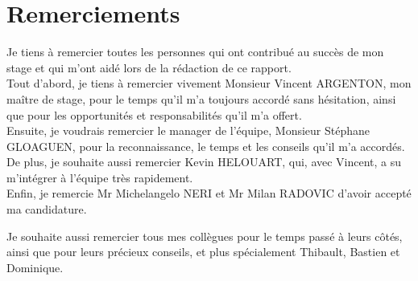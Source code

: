 \chapter*{Remerciements} %

Je tiens à remercier toutes les personnes qui ont contribué au succès de mon stage et qui m'ont aidé lors de la rédaction de ce rapport.  \\

Tout d'abord, je tiens à remercier vivement Monsieur Vincent ARGENTON, mon maître de stage, pour le temps qu'il m'a toujours accordé sans hésitation, ainsi que pour les opportunités et responsabilités qu'il m'a offert. \\

	Ensuite, je voudrais remercier le manager de l'équipe, Monsieur Stéphane GLOAGUEN, pour la reconnaissance, le temps et les conseils qu'il m'a accordés. \\

	De plus, je souhaite aussi remercier Kevin HELOUART, qui, avec Vincent, a su m'intégrer à l'équipe très rapidement.  \\

Enfin, je remercie Mr Michelangelo NERI et Mr Milan RADOVIC d'avoir accepté ma candidature.

Je souhaite aussi remercier tous mes collègues pour le temps passé à leurs côtés, ainsi que pour leurs précieux conseils, et plus spécialement Thibault, Bastien et Dominique.
